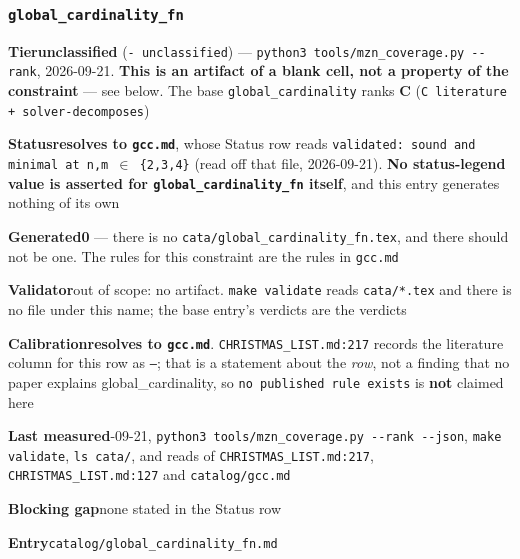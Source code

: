 \documentclass[10pt,a4paper]{article}
\newcommand{\entryfield}[2]{{\raggedright\textbf{#1}\quad #2\par}}
\begin{document}
\subsubsection*{\texttt{global\_\allowbreak{}cardinality\_\allowbreak{}fn}}
\label{entry:global-cardinality-fn}
\entryfield{Tier}{\textbf{unclassified} (\texttt{- unclassified}) --- \texttt{python3 tools/\allowbreak{}mzn\_\allowbreak{}coverage.\allowbreak{}py -\allowbreak{}-\allowbreak{}rank}, 2026-09-21. \textbf{This is an artifact of a blank cell, not a property of the constraint} --- see below. The base \texttt{global\_cardinality} ranks \textbf{C} (\texttt{C literature + solver-\allowbreak{}decomposes})}
\entryfield{Status}{\textbf{resolves to \texttt{gcc.md}}, whose Status row reads \texttt{validated: sound and minimal at n,m $\in$ \{2,3,4\}} (read off that file, 2026-09-21). \textbf{No status-legend value is asserted for \texttt{global\_cardinality\_fn} itself}, and this entry generates nothing of its own}
\entryfield{Generated}{\textbf{0} --- there is no \texttt{cata/\allowbreak{}global\_\allowbreak{}cardinality\_\allowbreak{}fn.\allowbreak{}tex}, and there should not be one. The rules for this constraint are the rules in \texttt{gcc.md}}
\entryfield{Validator}{out of scope: no artifact. \texttt{make validate} reads \texttt{cata/*.tex} and there is no file under this name; the base entry's verdicts are the verdicts}
\entryfield{Calibration}{\textbf{resolves to \texttt{gcc.md}}. \texttt{CHRISTMAS\_LIST.md:217} records the literature column for this row as \texttt{---}; that is a statement about the \emph{row}, not a finding that no paper explains global\_cardinality, so \texttt{no published rule exists} is \textbf{not} claimed here}
\entryfield{Last measured}{2026-09-21, \texttt{python3 tools/\allowbreak{}mzn\_\allowbreak{}coverage.\allowbreak{}py -\allowbreak{}-\allowbreak{}rank -\allowbreak{}-\allowbreak{}json}, \texttt{make validate}, \texttt{ls cata/}, and reads of \texttt{CHRISTMAS\_LIST.md:217}, \texttt{CHRISTMAS\_LIST.md:127} and \texttt{catalog/gcc.md}}
\entryfield{Blocking gap}{none stated in the Status row}
\entryfield{Entry}{\texttt{catalog/global\_cardinality\_fn.md}}
\end{document}
